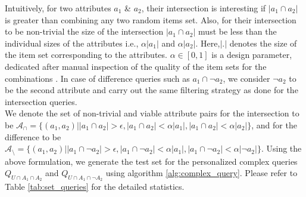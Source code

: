 Intuitively, for two attributes $a_1$ \& $a_2$, their intersection is interesting if $|a_1 \cap a_2|$ is greater than combining any two random items set. Also, for their intersection to be non-trivial the size of the intersection $|a_1 \cap a_2|$ must be less than the individual sizes of the attributes i.e., $\alpha|a_1|$ and $\alpha|a_2|$. Here,$|.|$ denotes the size of the item set corresponding to the attributes. $\alpha \in [0,1]$ is a design parameter, dedicated after manual inspection of the quality of the item sets for the combinations . In case of difference queries such as $a_1 \cap \neg a_2$, we consider $\neg a_2$ to be the second attribute and carry out the same filtering strategy as done for the intersection queries. \\We denote the set of non-trivial and viable attribute pairs for the intersection to be $\mathcal{A}_{\cap} = \{(a_1,a_2)| |a_1 \cap a_2| > \epsilon, |a_1 \cap a_2| <  \alpha|a_1|, |a_1 \cap a_2| <  \alpha|a_2|\}$, and for the difference to be $\mathcal{A}_{\setminus} = \{(a_1,a_2)| |a_1 \cap \neg a_2| > \epsilon, |a_1 \cap \neg a_2| <  \alpha|a_1|, |a_1 \cap \neg a_2| <  \alpha|\neg a_2|\}$. Using the above formulation, we generate the test set for the personalized complex queries $Q_{U \cap A_1 \cap A_2}$ and $Q_{U \cap A_1 \cap \neg A_2}$ using algorithm \ref{alg:complex_query}. Please refer to Table \ref{tab:set_queries} for the detailed statistics.

